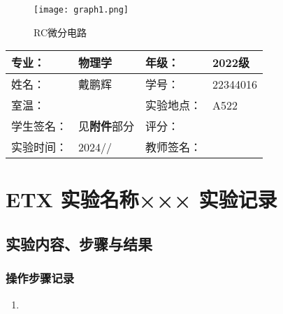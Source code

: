 \documentclass[dvipsnames, svgnames,a4paper,11pt]{article}
\begin{document}
		\begin{figure}[htbp]
			\centering
			\texttt{[image: graph1.png]}
			\caption{RC微分电路}
			\label{fig:graph1}
		\end{figure}



		
	
		
	
	
	
	
	\clearpage
	
	\begin{table}
		\renewcommand\arraystretch{1.7}
		\centering
		\begin{tabularx}{\textwidth}{|X|X|X|X|}
			\hline
			专业： & 物理学 & 年级： & 2022级 \\
			\hline
			姓名： & 戴鹏辉 & 学号： & 22344016\\
			\hline
			室温： &  & 实验地点： & A522 \\
			\hline
			学生签名：& 见\textbf{附件}部分 & 评分： &\\
			\hline
			实验时间：& 2024// & 教师签名：&\\
			\hline
		\end{tabularx}
	\end{table}
	
	\section{ETX 实验名称×××  \quad\heiti 实验记录}
	
	\subsection{实验内容、步骤与结果}
	
	\subsubsection{操作步骤记录}
	\begin{enumerate}
		\item 
	\end{enumerate}	
	
\end{document}
